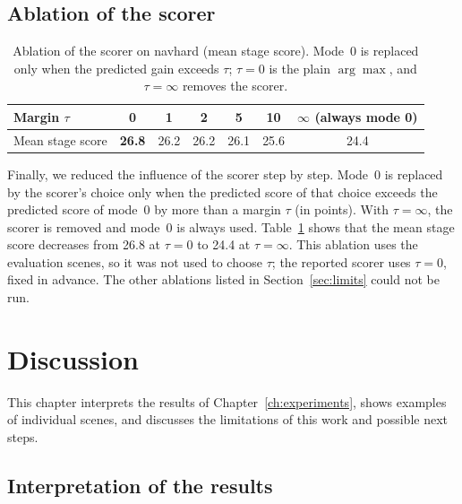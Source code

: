 \documentclass[11pt, a4paper, oneside]{book}
\begin{document}
\section{Ablation of the scorer}
\label{sec:ablation}

\begin{table}[ht]
\centering
\caption[Ablation of the scorer on navhard]{Ablation of the scorer on navhard (mean stage
score). Mode~0 is replaced only when the predicted gain exceeds $\tau$; $\tau=0$ is the plain
$\arg\max$, and $\tau=\infty$ removes the scorer.}
\label{tab:ablscorer}
\begin{tabular}{lcccccc}
\toprule
Margin $\tau$ & 0 & 1 & 2 & 5 & 10 & $\infty$ (always mode 0) \\
\midrule
Mean stage score & \textbf{26.8} & 26.2 & 26.2 & 26.1 & 25.6 & 24.4 \\
\bottomrule
\end{tabular}
\end{table}

Finally, we reduced the influence of the scorer step by step. Mode~0 is replaced by the
scorer's choice only when the predicted score of that choice exceeds the predicted score of
mode~0 by more than a margin $\tau$ (in points). With $\tau=\infty$, the scorer is removed and
mode~0 is always used. Table~\ref{tab:ablscorer} shows that the mean stage score decreases from
\num{26.8} at $\tau=0$ to \num{24.4} at $\tau=\infty$. This ablation uses the evaluation scenes,
so it was not used to choose $\tau$; the reported scorer uses $\tau=0$, fixed in advance. The
other ablations listed in Section~\ref{sec:limits} could not be run.

\chapter{Discussion}
\label{ch:discussion}
This chapter interprets the results of Chapter~\ref{ch:experiments}, shows examples of
individual scenes, and discusses the limitations of this work and possible next steps.

\section{Interpretation of the results}
\label{sec:interpretation}
\end{document}
